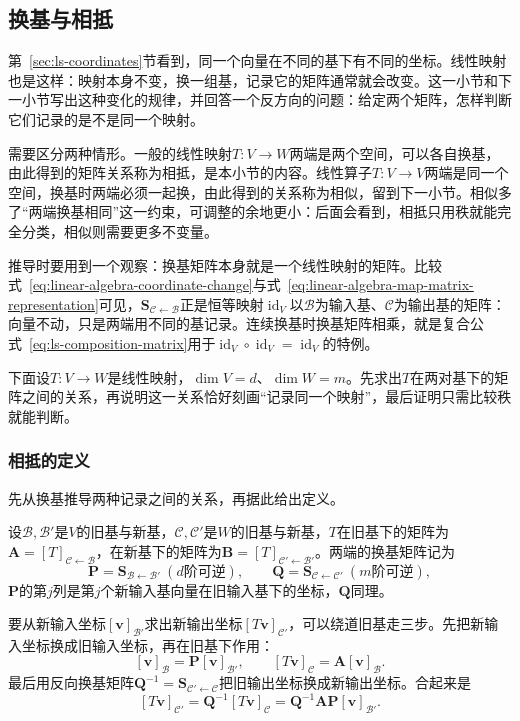 \subsection{换基与相抵}
\label{sec:ls-coordinates-change-of-basis}
\label{sec:ls-equivalence-matrices}

第~\ref{sec:ls-coordinates}节看到，同一个向量在不同的基下有不同的坐标。线性映射也是这样：映射本身不变，换一组基，记录它的矩阵通常就会改变。这一小节和下一小节写出这种变化的规律，并回答一个反方向的问题：给定两个矩阵，怎样判断它们记录的是不是同一个映射。

需要区分两种情形。一般的线性映射$T:V\to W$两端是两个空间，可以各自换基，由此得到的矩阵关系称为相抵，是本小节的内容。线性算子$T:V\to V$两端是同一个空间，换基时两端必须一起换，由此得到的关系称为相似，留到下一小节。相似多了“两端换基相同”这一约束，可调整的余地更小：后面会看到，相抵只用秩就能完全分类，相似则需要更多不变量。

推导时要用到一个观察：换基矩阵本身就是一个线性映射的矩阵。比较式~\eqref{eq:linear-algebra-coordinate-change}与式~\eqref{eq:linear-algebra-map-matrix-representation}可见，$\bm S_{\mathcal C\leftarrow\mathcal B}$正是恒等映射$\operatorname{id}_V$以$\mathcal B$为输入基、$\mathcal C$为输出基的矩阵：向量不动，只是两端用不同的基记录。连续换基时换基矩阵相乘，就是复合公式~\eqref{eq:ls-composition-matrix}用于$\operatorname{id}_V\circ\operatorname{id}_V=\operatorname{id}_V$的特例。

下面设$T:V\to W$是线性映射，$\dim V=d$、$\dim W=m$。先求出$T$在两对基下的矩阵之间的关系，再说明这一关系恰好刻画“记录同一个映射”，最后证明只需比较秩就能判断。

\subsubsection{相抵的定义}
\label{sec:ls-equivalence-definition}
先从换基推导两种记录之间的关系，再据此给出定义。

设$\mathcal B,\mathcal B'$是$V$的旧基与新基，$\mathcal C,\mathcal C'$是$W$的旧基与新基，$T$在旧基下的矩阵为$\bm A=[T]_{\mathcal C\leftarrow\mathcal B}$，在新基下的矩阵为$\bm B=[T]_{\mathcal C'\leftarrow\mathcal B'}$。两端的换基矩阵记为
\[
 \bm P=\bm S_{\mathcal B\leftarrow\mathcal B'}\ (d\text{阶可逆}),\qquad
 \bm Q=\bm S_{\mathcal C\leftarrow\mathcal C'}\ (m\text{阶可逆}),
\]
$\bm P$的第$j$列是第$j$个新输入基向量在旧输入基下的坐标，$\bm Q$同理。

要从新输入坐标$[\bm v]_{\mathcal B'}$求出新输出坐标$[T\bm v]_{\mathcal C'}$，可以绕道旧基走三步。先把新输入坐标换成旧输入坐标，再在旧基下作用：
\[
 [\bm v]_{\mathcal B}=\bm P[\bm v]_{\mathcal B'},\qquad
 [T\bm v]_{\mathcal C}=\bm A[\bm v]_{\mathcal B}.
\]
最后用反向换基矩阵$\bm Q^{-1}=\bm S_{\mathcal C'\leftarrow\mathcal C}$把旧输出坐标换成新输出坐标。合起来是
\[
 [T\bm v]_{\mathcal C'}=\bm Q^{-1}[T\bm v]_{\mathcal C}=\bm Q^{-1}\bm A\bm P[\bm v]_{\mathcal B'}.
\]

